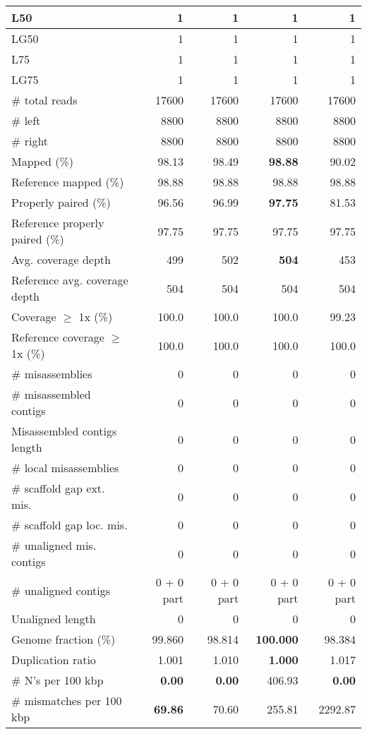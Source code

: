 \documentclass[12pt,a4paper]{article}
\begin{document}
\begin{table}[ht]
\begin{center}
\begin{tabular}{|l*{4}{|r}|}
L50 & 1 & 1 & 1 & 1 \\ \hline
LG50 & 1 & 1 & 1 & 1 \\ \hline
L75 & 1 & 1 & 1 & 1 \\ \hline
LG75 & 1 & 1 & 1 & 1 \\ \hline
\# total reads & 17600 & 17600 & 17600 & 17600 \\ \hline
\# left & 8800 & 8800 & 8800 & 8800 \\ \hline
\# right & 8800 & 8800 & 8800 & 8800 \\ \hline
Mapped (\%) & 98.13 & 98.49 & {\bf 98.88} & 90.02 \\ \hline
Reference mapped (\%) & 98.88 & 98.88 & 98.88 & 98.88 \\ \hline
Properly paired (\%) & 96.56 & 96.99 & {\bf 97.75} & 81.53 \\ \hline
Reference properly paired (\%) & 97.75 & 97.75 & 97.75 & 97.75 \\ \hline
Avg. coverage depth & 499 & 502 & {\bf 504} & 453 \\ \hline
Reference avg. coverage depth & 504 & 504 & 504 & 504 \\ \hline
Coverage $\geq$ 1x (\%) & 100.0 & 100.0 & 100.0 & 99.23 \\ \hline
Reference coverage $\geq$ 1x (\%) & 100.0 & 100.0 & 100.0 & 100.0 \\ \hline
\# misassemblies & 0 & 0 & 0 & 0 \\ \hline
\# misassembled contigs & 0 & 0 & 0 & 0 \\ \hline
Misassembled contigs length & 0 & 0 & 0 & 0 \\ \hline
\# local misassemblies & 0 & 0 & 0 & 0 \\ \hline
\# scaffold gap ext. mis. & 0 & 0 & 0 & 0 \\ \hline
\# scaffold gap loc. mis. & 0 & 0 & 0 & 0 \\ \hline
\# unaligned mis. contigs & 0 & 0 & 0 & 0 \\ \hline
\# unaligned contigs & 0 + 0 part & 0 + 0 part & 0 + 0 part & 0 + 0 part \\ \hline
Unaligned length & 0 & 0 & 0 & 0 \\ \hline
Genome fraction (\%) & 99.860 & 98.814 & {\bf 100.000} & 98.384 \\ \hline
Duplication ratio & 1.001 & 1.010 & {\bf 1.000} & 1.017 \\ \hline
\# N's per 100 kbp & {\bf 0.00} & {\bf 0.00} & 406.93 & {\bf 0.00} \\ \hline
\# mismatches per 100 kbp & {\bf 69.86} & 70.60 & 255.81 & 2292.87 \\ \hline

\end{tabular}
\end{center}
\end{table}
\end{document}
